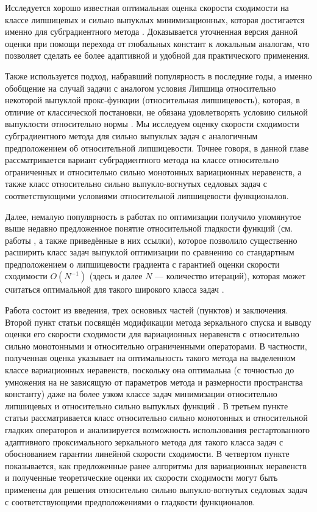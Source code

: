   Исследуется хорошо известная оптимальная оценка скорости сходимости на классе липшицевых и сильно выпуклых минимизационных, которая достигается именно для субградиентного метода \cite{Simon_Julien_Bach_2012}. Доказывается уточненная версия данной оценки при помощи перехода от глобальных констант к локальным аналогам, что позволяет сделать ее более адаптивной и удобной для практического применения. 

  Также используется подход, набравший популярность в последние годы, а именно обобщение на случай задачи с аналогом условия Липшица относительно некоторой выпуклой прокс-функции (относительная липшицевость), которая, в отличие от классической постановки, не обязана удовлетворять условию сильной выпуклости относительно нормы \cite{AdaMirr_2021,Lu_2018,Zhou_NIPS_2020}. Мы исследуем оценку скорости сходимости субградиентного метода для сильно выпуклых задач с аналогичным предположением об относительной липшицевости. Точнее говоря, в данной главе рассматривается вариант субградиентного метода на классе относительно ограниченных и относительно сильно монотонных вариационных неравенств, а также класс относительно сильно выпукло-вогнутых седловых задач с соответствующими условиями относительной липшицевости функционалов. 

  Далее, немалую популярность в работах по оптимизации получило упомянутое выше недавно предложенное понятие относительной гладкости функций (см. работы \cite{Bauschke,Drag,Dragomir,Lu_Nesterov_2018}, а также приведённые в них ссылки), которое позволило существенно расширить класс задач выпуклой оптимизации по сравнению со стандартным предположением о липшицевости градиента с гарантией оценки скорости сходимости $O(N^{-1})$ (здесь и далее $N$ --- количество итераций), которая может считаться оптимальной для такого широкого класса задач \cite{Dragomir}. 

  Работа состоит из введения, трех основных частей (пунктов) и заключения. Второй пункт статьи посвящён модификации метода зеркального спуска и выводу оценки его скорости сходимости для вариационных неравенств с относительно сильно монотонными и относительно ограниченными операторами. В частности, полученная оценка указывает на оптимальность такого метода на выделенном классе вариационных неравенств, поскольку она оптимальна (с точностью до умножения на не зависящую от параметров метода и размерности пространства константу) даже на более узком классе задач минимизации относительно липшицевых и относительно сильно выпуклых функций \cite{Lu_2018}. В третьем пункте статьи рассматривается класс относительно сильно монотонных и относительной гладких операторов и анализируется возможность использования рестартованного адаптивного проксимального зеркального метода для такого класса задач с обоснованием гарантии линейной скорости сходимости. В четвертом пункте показывается, как предложенные ранее алгоритмы для вариационных неравенств и полученные теоретические оценки их скорости сходимости могут быть применены для решения относительно сильно выпукло-вогнутых седловых задач с соответствующими предположениями о гладкости функционалов.

